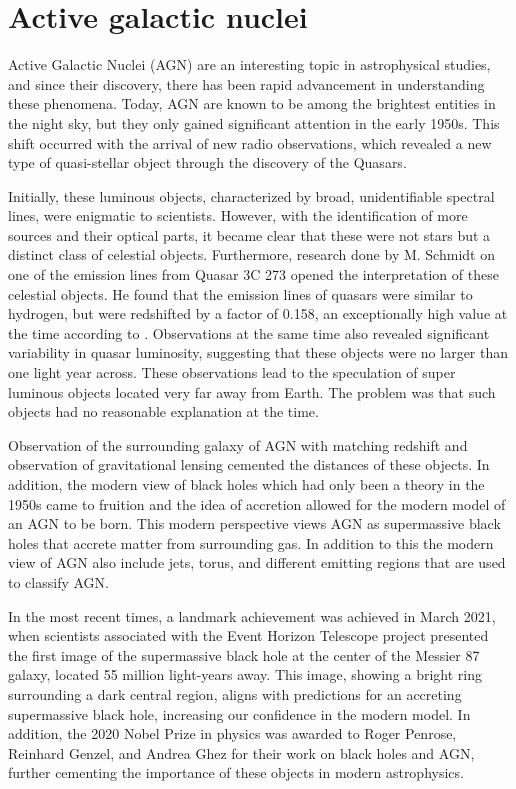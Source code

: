 \section{Active galactic nuclei}




Active Galactic Nuclei (AGN) are an interesting topic in astrophysical studies, and 
since their discovery, there has been rapid advancement in understanding these phenomena.
Today, AGN are known to be among the brightest entities in the night sky,
but they only gained significant attention in the early 1950s. 
This shift occurred with the arrival of new radio observations, which revealed a new type of quasi-stellar
object through the discovery of the Quasars.

Initially, these luminous objects, characterized by broad, 
unidentifiable spectral lines, were enigmatic to scientists. 
However, with the identification of more sources and their optical parts, 
it became clear that these were not stars but a distinct class of celestial objects. 
Furthermore, research done by M. Schmidt on one of the emission lines from 
Quasar 3C 273 opened the interpretation of these celestial objects. 
He found that the emission lines of quasars were similar to hydrogen, but were redshifted by a factor of 0.158,
an exceptionally high value at the time according to \cite{Shields_1999}. Observations at the same time also revealed significant 
variability in quasar luminosity, suggesting that these objects were no larger than one light year across. 
These observations lead to the speculation of super luminous objects located very far away from Earth. The problem was that such objects
had no reasonable explanation at the time. %

Observation of the surrounding galaxy of AGN with matching redshift and observation of gravitational lensing cemented 
the distances of these objects. In addition, the modern view of black holes which had only been a theory in the 1950s came to
fruition and the idea of accretion allowed for the modern model of an AGN to be born. This modern perspective views AGN as supermassive black holes that
accrete matter from surrounding gas. In addition to this the modern view of AGN also include jets, torus, and different emitting regions that are used to classify AGN.

In the most recent times, a landmark achievement was achieved in March 2021, when scientists associated with the Event Horizon Telescope project 
presented the first image of the supermassive black hole at the center of the Messier 87 galaxy, located 55 million light-years away.
This image, showing a bright ring surrounding a dark central region, aligns with predictions for an accreting supermassive black hole, 
increasing our confidence in the modern model. In addition, the 2020 Nobel Prize in physics was awarded to Roger Penrose, Reinhard Genzel, and Andrea Ghez for their work on black holes and AGN, 
further cementing the importance of these objects in modern astrophysics.






